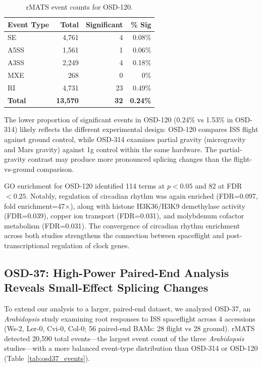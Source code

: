 \documentclass[12pt,a4paper]{article}
\begin{document}
\begin{table}[h]
\centering
\caption{rMATS event counts for OSD-120.}
\label{tab:osd120_events}
\begin{tabular}{lrrr}
\toprule
\textbf{Event Type} & \textbf{Total} & \textbf{Significant} & \textbf{\% Sig} \\
\midrule
SE & 4,761 & 4 & 0.08\% \\
A5SS & 1,561 & 1 & 0.06\% \\
A3SS & 2,249 & 4 & 0.18\% \\
MXE & 268 & 0 & 0\% \\
RI & 4,731 & 23 & 0.49\% \\
\textbf{Total} & \textbf{13,570} & \textbf{32} & \textbf{0.24\%} \\
\bottomrule
\end{tabular}
\end{table}

The lower proportion of significant events in OSD-120 (0.24\% vs 1.53\% in OSD-314) likely reflects the different experimental design: OSD-120 compares ISS flight against ground control, while OSD-314 examines partial gravity (microgravity and Mars gravity) against 1g control within the same hardware. The partial-gravity contrast may produce more pronounced splicing changes than the flight-vs-ground comparison.

GO enrichment for OSD-120 identified 114 terms at $p<0.05$ and 82 at FDR$<0.25$. Notably, regulation of circadian rhythm was again enriched (FDR=0.097, fold enrichment=47$\times$), along with histone H3K36/H3K9 demethylase activity (FDR=0.039), copper ion transport (FDR=0.031), and molybdenum cofactor metabolism (FDR=0.031). The convergence of circadian rhythm enrichment across both studies strengthens the connection between spaceflight and post-transcriptional regulation of clock genes.

\subsection{OSD-37: High-Power Paired-End Analysis Reveals Small-Effect Splicing Changes}

To extend our analysis to a larger, paired-end dataset, we analyzed OSD-37, an \textit{Arabidopsis} study examining root responses to ISS spaceflight across 4 accessions (Ws-2, Ler-0, Cvi-0, Col-0; 56 paired-end BAMs: 28 flight vs 28 ground). rMATS detected 20,590 total events---the largest event count of the three \textit{Arabidopsis} studies---with a more balanced event-type distribution than OSD-314 or OSD-120 (Table~\ref{tab:osd37_events}).
\end{document}
